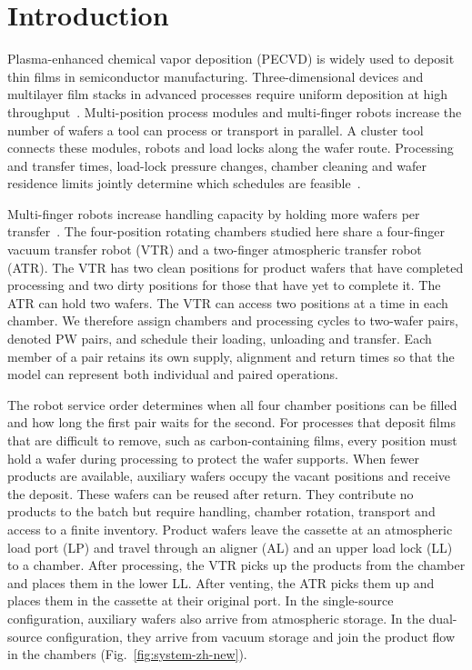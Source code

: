 \documentclass[final,5p,times,twocolumn]{elsarticle}
\begin{document}
\section{Introduction}

Plasma-enhanced chemical vapor deposition (PECVD) is widely used to deposit thin films in semiconductor manufacturing. Three-dimensional devices and multilayer film stacks in advanced processes require uniform deposition at high throughput~\citep{xia2016pecvd,kim2023onstack}. Multi-position process modules and multi-finger robots increase the number of wafers a tool can process or transport in parallel. A cluster tool connects these modules, robots and load locks along the wafer route. Processing and transfer times, load-lock pressure changes, chamber cleaning and wafer residence limits jointly determine which schedules are feasible~\citep{pan2018survey}.

Multi-finger robots increase handling capacity by holding more wafers per transfer~\citep{gu2024applied,gu2024multifinger}. The four-position rotating chambers studied here share a four-finger vacuum transfer robot (VTR) and a two-finger atmospheric transfer robot (ATR). The VTR has two clean positions for product wafers that have completed processing and two dirty positions for those that have yet to complete it. The ATR can hold two wafers. The VTR can access two positions at a time in each chamber. We therefore assign chambers and processing cycles to two-wafer pairs, denoted PW pairs, and schedule their loading, unloading and transfer. Each member of a pair retains its own supply, alignment and return times so that the model can represent both individual and paired operations.

The robot service order determines when all four chamber positions can be filled and how long the first pair waits for the second. For processes that deposit films that are difficult to remove, such as carbon-containing films, every position must hold a wafer during processing to protect the wafer supports. When fewer products are available, auxiliary wafers occupy the vacant positions and receive the deposit. These wafers can be reused after return. They contribute no products to the batch but require handling, chamber rotation, transport and access to a finite inventory. Product wafers leave the cassette at an atmospheric load port (LP) and travel through an aligner (AL) and an upper load lock (LL) to a chamber. After processing, the VTR picks up the products from the chamber and places them in the lower LL. After venting, the ATR picks them up and places them in the cassette at their original port. In the single-source configuration, auxiliary wafers also arrive from atmospheric storage. In the dual-source configuration, they arrive from vacuum storage and join the product flow in the chambers (Fig.~\ref{fig:system-zh-new}).
\end{document}
